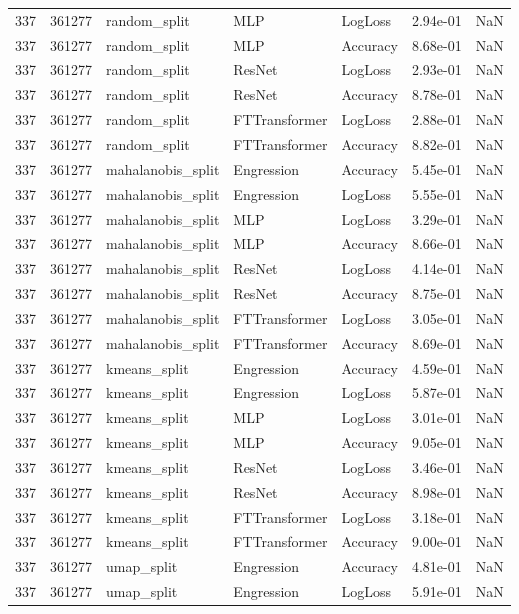 \begin{tabular}{rrlllrr}
337 & 361277 & random\_split & MLP & LogLoss & 2.94e-01 & NaN \\
337 & 361277 & random\_split & MLP & Accuracy & 8.68e-01 & NaN \\
337 & 361277 & random\_split & ResNet & LogLoss & 2.93e-01 & NaN \\
337 & 361277 & random\_split & ResNet & Accuracy & 8.78e-01 & NaN \\
337 & 361277 & random\_split & FTTransformer & LogLoss & 2.88e-01 & NaN \\
337 & 361277 & random\_split & FTTransformer & Accuracy & 8.82e-01 & NaN \\
337 & 361277 & mahalanobis\_split & Engression & Accuracy & 5.45e-01 & NaN \\
337 & 361277 & mahalanobis\_split & Engression & LogLoss & 5.55e-01 & NaN \\
337 & 361277 & mahalanobis\_split & MLP & LogLoss & 3.29e-01 & NaN \\
337 & 361277 & mahalanobis\_split & MLP & Accuracy & 8.66e-01 & NaN \\
337 & 361277 & mahalanobis\_split & ResNet & LogLoss & 4.14e-01 & NaN \\
337 & 361277 & mahalanobis\_split & ResNet & Accuracy & 8.75e-01 & NaN \\
337 & 361277 & mahalanobis\_split & FTTransformer & LogLoss & 3.05e-01 & NaN \\
337 & 361277 & mahalanobis\_split & FTTransformer & Accuracy & 8.69e-01 & NaN \\
337 & 361277 & kmeans\_split & Engression & Accuracy & 4.59e-01 & NaN \\
337 & 361277 & kmeans\_split & Engression & LogLoss & 5.87e-01 & NaN \\
337 & 361277 & kmeans\_split & MLP & LogLoss & 3.01e-01 & NaN \\
337 & 361277 & kmeans\_split & MLP & Accuracy & 9.05e-01 & NaN \\
337 & 361277 & kmeans\_split & ResNet & LogLoss & 3.46e-01 & NaN \\
337 & 361277 & kmeans\_split & ResNet & Accuracy & 8.98e-01 & NaN \\
337 & 361277 & kmeans\_split & FTTransformer & LogLoss & 3.18e-01 & NaN \\
337 & 361277 & kmeans\_split & FTTransformer & Accuracy & 9.00e-01 & NaN \\
337 & 361277 & umap\_split & Engression & Accuracy & 4.81e-01 & NaN \\
337 & 361277 & umap\_split & Engression & LogLoss & 5.91e-01 & NaN \\

\end{tabular}
